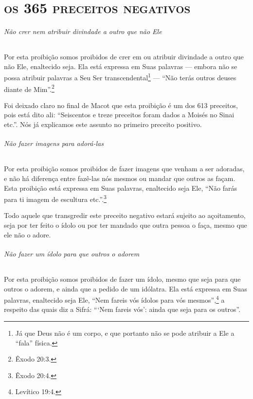 \setcounter{secnumdepth}{-2}

\part{\textsc{os 365 preceitos negativos}}



\setcounter{paragraph}{0}
\setcounter{secnumdepth}{4}

\paragraph{Não crer nem atribuir divindade a outro que não Ele}

Por esta proibição somos proibidos de crer em ou atribuir divindade a
outro que não Ele, enaltecido seja. Ela está expressa em Suas palavras
--- embora não se possa atribuir palavras a Seu Ser
transcendental\footnote{Já que Deus não é um corpo, e que portanto não se pode atribuir a Ele a ``fala'' física.} --- ``Não terás outros deuses
diante de Mim''.\footnote{Êxodo 20:3.}

Foi deixado claro no final de Macot que esta proibição é um dos 613
preceitos, pois está dito ali: ``Seiscentos e treze preceitos foram
dados a Moisés no Sinai etc.''. Nós já explicamos este assunto no
primeiro preceito positivo.

\paragraph{Não fazer imagens para adorá-las}

Por esta proibição somos proibidos de fazer imagens que venham a ser
adoradas, e não há diferença entre fazê-las nós mesmos ou mandar que
outros as façam. Esta proibição está expressa em Suas palavras,
enaltecido seja Ele, ``Não farás para ti imagem de escultura etc.''.\footnote{Êxodo 20:4.}

Todo aquele que transgredir este preceito negativo estará sujeito ao
açoitamento, seja por ter feito o ídolo ou por ter mandado que outra
pessoa o faça, mesmo que ele não o adore.

\paragraph{Não fazer um ídolo para que outros o adorem}

Por esta proibição somos proibidos de fazer um ídolo, mesmo que seja
para que outros o adorem, e ainda que a pedido de um idólatra. Ela está
expressa em Suas palavras, enaltecido seja Ele, ``Nem fareis vós ídolos
para vós mesmos'',\footnote{Levítico 19:4.} a respeito das quais diz a Sifrá:
```Nem fareis vós': ainda que seja para os outros''.

